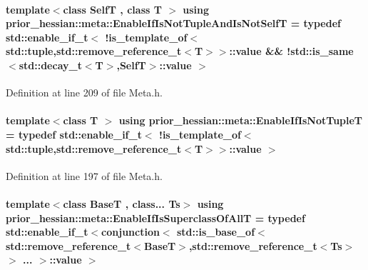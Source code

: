 \paragraph[{\texorpdfstring{Enable\+If\+Is\+Not\+Tuple\+And\+Is\+Not\+SelfT}{EnableIfIsNotTupleAndIsNotSelfT}}]{\setlength{\rightskip}{0pt plus 5cm}template$<$class SelfT , class T $>$ using {\bf prior\+\_\+hessian\+::meta\+::\+Enable\+If\+Is\+Not\+Tuple\+And\+Is\+Not\+SelfT} = typedef std\+::enable\+\_\+if\+\_\+t$<$ !{\bf is\+\_\+template\+\_\+of}$<$std\+::tuple,std\+::remove\+\_\+reference\+\_\+t$<$T$>$$>$\+::value \&\& !std\+::is\+\_\+same$<$std\+::decay\+\_\+t$<$T$>$,SelfT$>$\+::value $>$}\hypertarget{namespaceprior__hessian_1_1meta_a334715ebe83bc8b5ece276b960071701}{}\label{namespaceprior__hessian_1_1meta_a334715ebe83bc8b5ece276b960071701}


Definition at line 209 of file Meta.\+h.

\paragraph[{\texorpdfstring{Enable\+If\+Is\+Not\+TupleT}{EnableIfIsNotTupleT}}]{\setlength{\rightskip}{0pt plus 5cm}template$<$class T $>$ using {\bf prior\+\_\+hessian\+::meta\+::\+Enable\+If\+Is\+Not\+TupleT} = typedef std\+::enable\+\_\+if\+\_\+t$<$ !{\bf is\+\_\+template\+\_\+of}$<$std\+::tuple,std\+::remove\+\_\+reference\+\_\+t$<$T$>$$>$\+::value $>$}\hypertarget{namespaceprior__hessian_1_1meta_a3ea8e11b3e91986909abe98764a02990}{}\label{namespaceprior__hessian_1_1meta_a3ea8e11b3e91986909abe98764a02990}


Definition at line 197 of file Meta.\+h.

\paragraph[{\texorpdfstring{Enable\+If\+Is\+Superclass\+Of\+AllT}{EnableIfIsSuperclassOfAllT}}]{\setlength{\rightskip}{0pt plus 5cm}template$<$class BaseT , class... Ts$>$ using {\bf prior\+\_\+hessian\+::meta\+::\+Enable\+If\+Is\+Superclass\+Of\+AllT} = typedef std\+::enable\+\_\+if\+\_\+t$<${\bf conjunction}$<$ std\+::is\+\_\+base\+\_\+of$<$std\+::remove\+\_\+reference\+\_\+t$<$BaseT$>$,std\+::remove\+\_\+reference\+\_\+t$<$Ts$>$$>$ ... $>$\+::value $>$}\hypertarget{namespaceprior__hessian_1_1meta_a0413ae4eb881eabac578a1283fbff570}{}\label{namespaceprior__hessian_1_1meta_a0413ae4eb881eabac578a1283fbff570}


